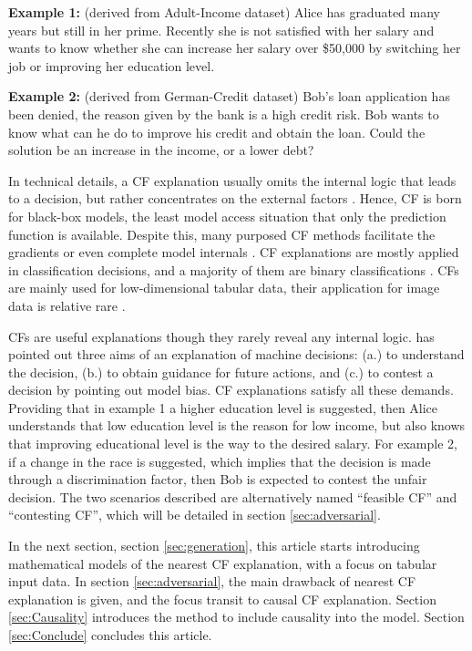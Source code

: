 \noindent \textbf{Example 1:} \label{a}(derived from Adult-Income dataset) Alice has graduated many years but still in her prime. Recently she is not satisfied with her salary and wants to know whether she can increase her salary over \$50,000 by switching her job or improving her education level.

\noindent \textbf{Example 2:} \label{b}(derived from German-Credit dataset) Bob's loan application has been denied, the reason given by the bank is a high credit risk. Bob wants to know what can he do to improve his credit and obtain the loan. Could the solution be an increase in the income, or a lower debt?

In technical details, a CF explanation usually omits the internal logic that leads to a decision, but rather concentrates on the external factors \cite{watcher2017}. Hence, CF is born for black-box models, the least model access situation that only the prediction function is available. Despite this, many purposed CF methods facilitate the gradients or even complete model internals \cite{CFReview}. CF explanations are mostly applied in classification decisions, and a majority of them are binary classifications \cite{CFandAE}. CFs are mainly used for low-dimensional tabular data, their application for image data is relative rare \cite{CFandAE}.

CFs are useful explanations though they rarely reveal any internal logic. \citeauthor{watcher2017} \cite{watcher2017} has pointed out three aims of an explanation of machine decisions: (a.) to understand the decision, (b.) to obtain guidance for future actions, and (c.) to contest a decision by pointing out model bias. CF explanations satisfy all these demands. Providing that in example 1 a higher education level is suggested, then Alice understands that low education level is the reason for low income, but also knows that improving educational level is the way to the desired salary. For example 2, if a change in the race is suggested, which implies that the decision is made through a discrimination factor, then Bob is expected to contest the unfair decision. The two scenarios described are alternatively named ``feasible CF'' and ``contesting CF'', which will be detailed in section \ref{sec:adversarial}.

In the next section, section \ref{sec:generation}, this article starts introducing mathematical models of the nearest CF explanation, with a focus on tabular input data. In section \ref{sec:adversarial}, the main drawback of nearest CF explanation is given, and the focus transit to causal CF explanation. Section \ref{sec:Causality} introduces the method to include causality into the model. Section \ref{sec:Conclude} concludes this article.

